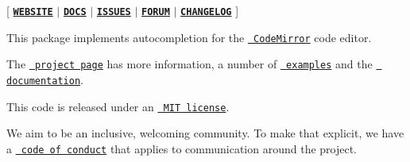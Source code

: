 \mbox{[} \href{https://codemirror.net/}{\texttt{ {\bfseries{W\+E\+B\+S\+I\+TE}}}} $\vert$ \href{https://codemirror.net/docs/ref/\#autocomplete}{\texttt{ {\bfseries{D\+O\+CS}}}} $\vert$ \href{https://github.com/codemirror/dev/issues}{\texttt{ {\bfseries{I\+S\+S\+U\+ES}}}} $\vert$ \href{https://discuss.codemirror.net/c/next/}{\texttt{ {\bfseries{F\+O\+R\+UM}}}} $\vert$ \href{https://github.com/codemirror/autocomplete/blob/main/CHANGELOG.md}{\texttt{ {\bfseries{C\+H\+A\+N\+G\+E\+L\+OG}}}} \mbox{]}

This package implements autocompletion for the \href{https://codemirror.net/}{\texttt{ Code\+Mirror}} code editor.

The \href{https://codemirror.net/}{\texttt{ project page}} has more information, a number of \href{https://codemirror.net/examples/}{\texttt{ examples}} and the \href{https://codemirror.net/docs/}{\texttt{ documentation}}.

This code is released under an \href{https://github.com/codemirror/autocomplete/tree/main/LICENSE}{\texttt{ M\+IT license}}.

We aim to be an inclusive, welcoming community. To make that explicit, we have a \href{http://contributor-covenant.org/version/1/1/0/}{\texttt{ code of conduct}} that applies to communication around the project. 